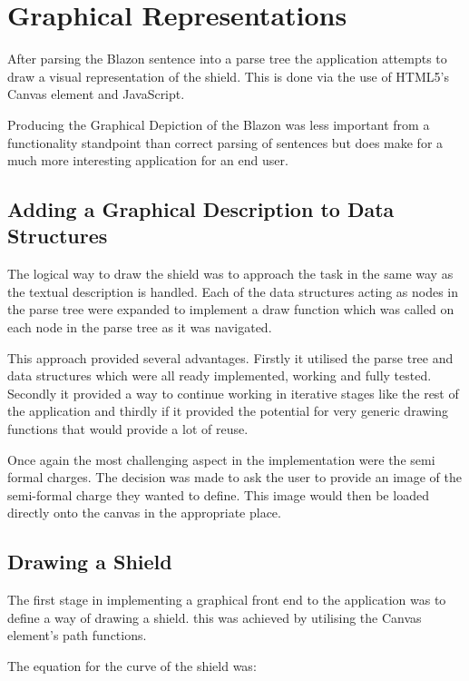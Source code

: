 \chapter{Graphical Representations} 

After parsing the Blazon sentence into a parse tree the application attempts to draw a visual representation of the shield.  This is done via the use of HTML5's Canvas element and JavaScript.  

Producing the Graphical Depiction of the Blazon was less important from a  functionality standpoint than correct parsing of sentences but does make for a much more interesting application for an end user.  


\section{Adding a Graphical Description to Data Structures}
The logical way to draw the shield was to approach the task in the same way as the textual description is handled.  Each of the data structures acting as nodes in the parse tree were expanded to implement a draw function which was called on each node in the parse tree as it was navigated. 


This approach provided several advantages.  Firstly it utilised the parse tree and data structures which were all ready implemented, working and fully tested.  Secondly it provided a way to continue working in iterative stages like the rest of the application and thirdly if it provided the potential for very generic drawing functions that would provide a lot of reuse.


Once again the most challenging aspect in the implementation were the semi formal charges.  The decision was made to ask the user to provide an image of the semi-formal charge they wanted to define.  This image would then be loaded directly onto the canvas in the appropriate place.  




\section{Drawing a Shield}

The first stage in implementing a graphical front end to the application was to define a way of drawing a shield.  this was achieved by utilising the Canvas element's path functions.  


The equation for the curve of the shield was:


